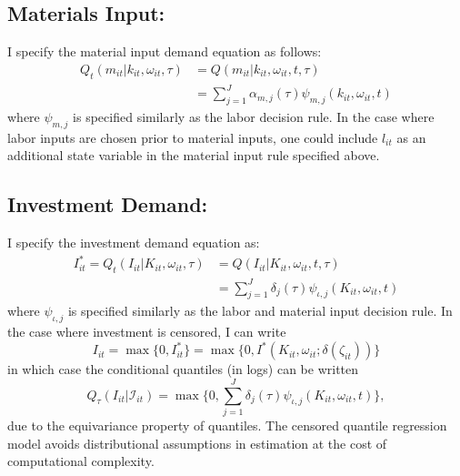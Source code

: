 \documentclass{article}
\begin{document}
\subsection*{Materials Input:}
I specify the material input demand equation as follows:
\begin{equation}\label{mmodel}
\begin{split}
Q_{t}(m_{it}|k_{it}, \omega_{it}, \tau)&=Q(m_{it}|k_{it}, \omega_{it}, t, \tau)\\
&=\sum_{j=1}^{J}\alpha_{m,j}(\tau)\psi_{m,j}(k_{it}, \omega_{it}, t)
\end{split}
\end{equation}
where $\psi_{m,j}$ is specified similarly as the labor decision rule. In the case where labor inputs are chosen prior to material inputs, one could include $l_{it}$ as an additional state variable in the material input rule specified above.

\subsection*{Investment Demand:}
I specify the investment demand equation as:
\begin{equation}\label{imodel}
\begin{split}
I^{*}_{it}=Q_{t}(I_{it}|K_{it}, \omega_{it}, \tau)&=Q(I_{it}|K_{it}, \omega_{it}, t, \tau)\\
&=\sum_{j=1}^{J}\delta_{j}(\tau)\psi_{\iota,j}(K_{it}, \omega_{it}, t)
\end{split}
\end{equation}
where $\psi_{\iota,j}$ is specified similarly as the labor and material input decision rule. In the case where investment is censored, I can write
\begin{equation}
I_{it}=\max\{0, I^{*}_{it}\}=\max\{0, I^{*}(K_{it}, \omega_{it}; \delta(\zeta_{it}))\}
\end{equation}
in which case the conditional quantiles (in logs) can be written
\begin{equation}
Q_{\tau}(I_{it}|\mathcal{I}_{it})=\max\{0, \sum_{j=1}^{J}\delta_{j}(\tau)\psi_{\iota,j}(K_{it}, \omega_{it}, t)\},
\end{equation}
due to the equivariance property of quantiles. The censored quantile regression model avoids distributional assumptions in estimation at the cost of computational complexity.
\end{document}
